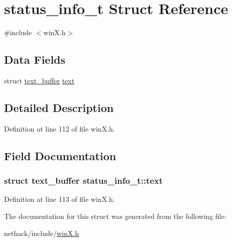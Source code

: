 \hypertarget{structstatus__info__t}{\section{status\+\_\+info\+\_\+t Struct Reference}
\label{structstatus__info__t}
}


{\ttfamily \#include $<$win\+X.\+h$>$}

\subsection*{Data Fields}
\begin{DoxyCompactItemize}
\item 
struct \hyperlink{structtext__buffer}{text\+\_\+buffer} \hyperlink{structstatus__info__t_a93722fc0a0a593fc48ed6bc55b360ab6}{text}
\end{DoxyCompactItemize}


\subsection{Detailed Description}


Definition at line 112 of file win\+X.\+h.



\subsection{Field Documentation}
\hypertarget{structstatus__info__t_a93722fc0a0a593fc48ed6bc55b360ab6}{
\subsubsection[{text}]{\setlength{\rightskip}{0pt plus 5cm}struct {\bf text\+\_\+buffer} status\+\_\+info\+\_\+t\+::text}}\label{structstatus__info__t_a93722fc0a0a593fc48ed6bc55b360ab6}


Definition at line 113 of file win\+X.\+h.



The documentation for this struct was generated from the following file\+:\begin{DoxyCompactItemize}
\item 
nethack/include/\hyperlink{winX_8h}{win\+X.\+h}\end{DoxyCompactItemize}
